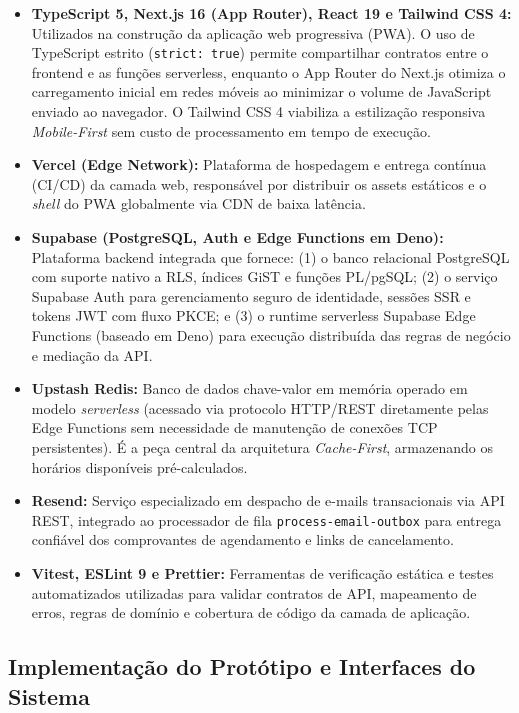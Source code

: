 \documentclass[12pt,a4paper]{article}
\begin{document}
\begin{itemize}
    \item \textbf{TypeScript 5, Next.js 16 (App Router), React 19 e Tailwind CSS 4:} Utilizados na construção da aplicação web progressiva (PWA). O uso de TypeScript estrito (\texttt{strict: true}) permite compartilhar contratos entre o frontend e as funções serverless, enquanto o App Router do Next.js otimiza o carregamento inicial em redes móveis ao minimizar o volume de JavaScript enviado ao navegador. O Tailwind CSS 4 viabiliza a estilização responsiva \textit{Mobile-First} sem custo de processamento em tempo de execução.
    \item \textbf{Vercel (Edge Network):} Plataforma de hospedagem e entrega contínua (CI/CD) da camada web, responsável por distribuir os assets estáticos e o \textit{shell} do PWA globalmente via CDN de baixa latência.
    \item \textbf{Supabase (PostgreSQL, Auth e Edge Functions em Deno):} Plataforma backend integrada que fornece: (1) o banco relacional PostgreSQL com suporte nativo a RLS, índices GiST e funções PL/pgSQL; (2) o serviço Supabase Auth para gerenciamento seguro de identidade, sessões SSR e tokens JWT com fluxo PKCE; e (3) o runtime serverless Supabase Edge Functions (baseado em Deno) para execução distribuída das regras de negócio e mediação da API.
    \item \textbf{Upstash Redis:} Banco de dados chave-valor em memória operado em modelo \textit{serverless} (acessado via protocolo HTTP/REST diretamente pelas Edge Functions sem necessidade de manutenção de conexões TCP persistentes). É a peça central da arquitetura \textit{Cache-First}, armazenando os horários disponíveis pré-calculados.
    \item \textbf{Resend:} Serviço especializado em despacho de e-mails transacionais via API REST, integrado ao processador de fila \texttt{process-email-outbox} para entrega confiável dos comprovantes de agendamento e links de cancelamento.
    \item \textbf{Vitest, ESLint 9 e Prettier:} Ferramentas de verificação estática e testes automatizados utilizadas para validar contratos de API, mapeamento de erros, regras de domínio e cobertura de código da camada de aplicação.
\end{itemize}


\subsection{Implementação do Protótipo e Interfaces do Sistema}
\label{subsec:implementacao_prototipo}
\end{document}
